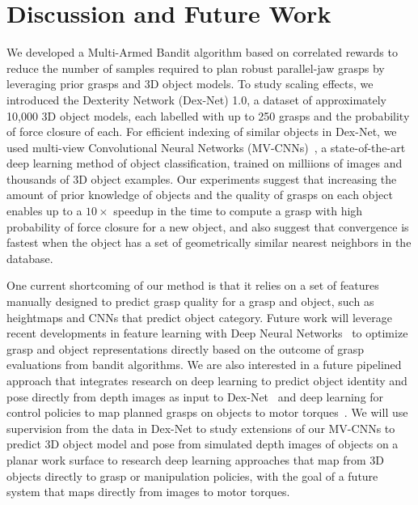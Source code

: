 \section{Discussion and Future Work}
We developed a Multi-Armed Bandit algorithm based on correlated rewards to reduce the number of samples required to plan robust parallel-jaw grasps by leveraging prior grasps and 3D object models.
To study scaling effects, we introduced the Dexterity Network (Dex-Net) 1.0, a dataset of approximately 10,000 3D object models, each labelled with up to 250 grasps and the probability of force closure of each.
For efficient indexing of similar objects in Dex-Net, we used multi-view Convolutional Neural Networks (MV-CNNs)~\cite{su2015multi}, a state-of-the-art deep learning method of object classification, trained on milliions of images and thousands of 3D object examples.
Our experiments suggest that increasing the amount of prior knowledge of objects and the quality of grasps on each object enables up to a $10\times$ speedup in the time to compute a grasp with high probability of force closure for a new object, and also suggest that convergence is fastest when the object has a set of geometrically similar nearest neighbors in the database.

One current shortcoming of our method is that it relies on a set of features manually designed to predict grasp quality for a grasp and object, such as heightmaps and CNNs that predict object category.
Future work will leverage recent developments in feature learning with Deep Neural Networks~\cite{krizhevsky2012imagenet} to optimize grasp and object representations directly based on the outcome of grasp evaluations from bandit algorithms.
We are also interested in a future pipelined approach that integrates research on deep learning to predict object identity and pose directly from depth images as input to Dex-Net~\cite{guptaCVPR15a} and deep learning for control policies to map planned grasps on objects to motor torques~\cite{levine2015end}. 
We will use supervision from the data in Dex-Net to study extensions of our MV-CNNs to predict 3D object model and pose from simulated depth images of objects on a planar work surface to research deep learning approaches that map from 3D objects directly to grasp or manipulation policies, with the goal of a future system that maps directly from images to motor torques.

